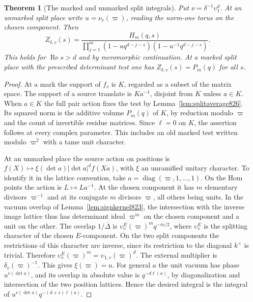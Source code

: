 \documentclass[a4paper,11pt]{article}
\newtheorem{theorem}[proposition]{Theorem}
\theoremstyle{definition}
\theoremstyle{remark}
\numberwithin{equation}{section}
\begin{document}
\begin{theorem}[The marked and unmarked split integrals]
\leavevmode\label{thm:splitzeta827}
Put \(\nu=\delta^{-1}\upsilon_1^d\). At an unmarked split
place write \(u=\nu_v(\varpi)\), reading the norm-one
torus on the chosen component. Then
\[
 Z_{\delta,v}(s)=
 \frac{H_m(q,s)}
 {\displaystyle\prod_{j=1}^m
       (1-uq^{d-j-s})(1-u^{-1}q^{d-j-s})}.
\]
This holds for \(\operatorname{Re}s>d\) and by meromorphic
continuation. At a marked split place with the prescribed
determinant test one has \(Z_{\delta,v}(s)=P_m(q)\) for all \(s\).
\end{theorem}
\begin{proof}
At a mark the support of \(f_v\) is \(K\), regarded as a
subset of the matrix space. The support of a source translate
is \(Ka^{-1}\), disjoint from \(K\) unless \(a\in K\).
When \(a\in K\) the full pair action fixes the test by
Lemma~\ref{lem:splitaverage826}. Its squared norm is the
additive volume \(P_m(q)\) of \(K\), by reduction modulo
\(\varpi\) and the count of invertible residue matrices.
Since \(\ell=0\) on \(K\), the assertion follows at every
complex parameter. This includes an old marked test written
modulo \(\varpi^2\) with a tame unit character.

At an unmarked place the source action on positions is
\(f(X)\mapsto \xi(\det a)|\det a|^d f(Xa)\), with \(\xi\)
an unramified unitary character. To identify it in the
lattice convention, take \(a=\operatorname{diag}(\varpi,1,\ldots,1)\).
On the Hom points the action is \(L\mapsto La^{-1}\).
At the chosen component it has \(m\) elementary divisors
\(\varpi^{-1}\) and at its conjugate \(m\) divisors
\(\varpi\), all others being units. In the vacuum overlap
of Lemma~\ref{lem:signkernel823}, the intersection with the
inverse image lattice thus has determinant ideal
\(\varpi^m\) on the chosen component and a unit on the other.
The overlap \(1/\overline{\Delta}\) is
\(\upsilon_v^{E}(\varpi)^m q^{-m/2}\), where
\(\upsilon_v^{E}\) is the splitting character of the chosen
\(E\)-component. On the two split components the restrictions
of this character are inverse, since its restriction to the
diagonal \(k^\times\) is trivial. Therefore
\(\upsilon_v^{E}(\varpi)^m=\upsilon_{1,v}(\varpi)^d\).
The external multiplier is \(\delta_v(\varpi)^{-1}\).
This gives \(\xi(\varpi)=u\). For general \(a\) the unit
vacuum has phase \(u^{v(\det a)}\), and its overlap in
absolute value is \(q^{-d\ell(a)}\), by diagonalization and
intersection of the two position lattices. Hence the desired
integral is the integral of
\(u^{v(\det a)}q^{-(d+s)\ell(a)}\).


\end{proof}
\end{document}
